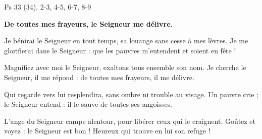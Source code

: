 Ps 33 (34), 2-3, 4-5, 6-7, 8-9

\textbf{De toutes mes frayeurs, le Seigneur me délivre.}

\smallskip

Je bénirai le Seigneur en tout temps,
sa louange sans cesse à mes lèvres.
Je me glorifierai dans le Seigneur :
que les pauvres m’entendent et soient en fête !
\smallskip

Magnifiez avec moi le Seigneur,
exaltons tous ensemble son nom.
Je cherche le Seigneur, il me répond :
de toutes mes frayeurs, il me délivre.
\smallskip

Qui regarde vers lui resplendira,
sans ombre ni trouble au visage.
Un pauvre crie ; le Seigneur entend :
il le sauve de toutes ses angoisses.
\smallskip

L’ange du Seigneur campe alentour,
pour libérer ceux qui le craignent.
Goûtez et voyez : le Seigneur est bon !
Heureux qui trouve en lui son refuge !

